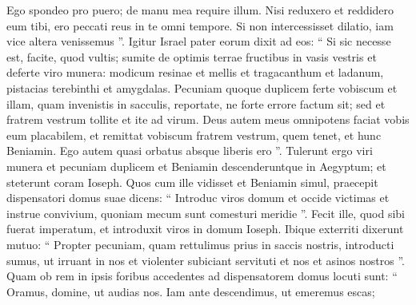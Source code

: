 \begin{biblechapter}
\begin{biblechapter}
\begin{biblechapter}
\begin{biblechapter}
\begin{biblechapter}
\begin{biblechapter}
\begin{biblechapter}
\begin{biblechapter}
\begin{biblechapter}
\begin{biblechapter}
\begin{biblechapter}
\begin{biblechapter}
\begin{biblechapter}
\begin{biblechapter}
\begin{biblechapter}
\begin{biblechapter}
\begin{biblechapter}
\begin{biblechapter}
\begin{biblechapter}
\begin{biblechapter}
\begin{biblechapter}
\begin{biblechapter}
\begin{biblechapter}
\begin{biblechapter}
\begin{biblechapter}
\begin{biblechapter}
\begin{biblechapter}
\begin{biblechapter}
\begin{biblechapter}
\begin{biblechapter}
\begin{biblechapter}
\begin{biblechapter}
\begin{biblechapter}
\begin{biblechapter}
\begin{biblechapter}
\begin{biblechapter}
\begin{biblechapter}
\begin{biblechapter}
\begin{biblechapter}
\begin{biblechapter}
\begin{biblechapter}
\begin{biblechapter}
\begin{biblechapter}
\verse Ego spondeo pro puero; de manu mea require illum. Nisi reduxero et reddidero eum tibi, ero peccati reus in te omni tempore. 
\verse Si non intercessisset dilatio, iam vice altera venissemus ”.
 \verse Igitur Israel pater eorum dixit ad eos: “ Si sic necesse est, facite, quod vultis; sumite de optimis terrae fructibus in vasis vestris et deferte viro munera: modicum resinae et mellis et tragacanthum et ladanum, pistacias terebinthi et amygdalas. 
\verse Pecuniam quoque duplicem ferte vobiscum et illam, quam invenistis in sacculis, reportate, ne forte errore factum sit; 
 \verse sed et fratrem vestrum tollite et ite ad virum. 
\verse Deus autem meus omnipotens faciat vobis eum placabilem, et remittat vobiscum fratrem vestrum, quem tenet, et hunc Beniamin. Ego autem quasi orbatus absque liberis ero ”.
 \verse Tulerunt ergo viri munera et pecuniam duplicem et Beniamin descenderuntque in Aegyptum; et steterunt coram Ioseph. 
\verse Quos cum ille vidisset et Beniamin simul, praecepit dispensatori domus suae dicens: “ Introduc viros domum et occide victimas et instrue convivium, quoniam mecum sunt comesturi meridie ”. 
\verse Fecit ille, quod sibi fuerat imperatum, et introduxit viros in domum Ioseph.
 \verse Ibique exterriti dixerunt mutuo: “ Propter pecuniam, quam rettulimus prius in saccis nostris, introducti sumus, ut irruant in nos et violenter subiciant servituti et nos et asinos nostros ”. 
\verse Quam ob rem in ipsis foribus accedentes ad dispensatorem domus 
\verse locuti sunt: “ Oramus, domine, ut audias nos. Iam ante descendimus, ut emeremus escas; 

\end{biblechapter}
\end{biblechapter}
\end{biblechapter}
\end{biblechapter}
\end{biblechapter}
\end{biblechapter}
\end{biblechapter}
\end{biblechapter}
\end{biblechapter}
\end{biblechapter}
\end{biblechapter}
\end{biblechapter}
\end{biblechapter}
\end{biblechapter}
\end{biblechapter}
\end{biblechapter}
\end{biblechapter}
\end{biblechapter}
\end{biblechapter}
\end{biblechapter}
\end{biblechapter}
\end{biblechapter}
\end{biblechapter}
\end{biblechapter}
\end{biblechapter}
\end{biblechapter}
\end{biblechapter}
\end{biblechapter}
\end{biblechapter}
\end{biblechapter}
\end{biblechapter}
\end{biblechapter}
\end{biblechapter}
\end{biblechapter}
\end{biblechapter}
\end{biblechapter}
\end{biblechapter}
\end{biblechapter}
\end{biblechapter}
\end{biblechapter}
\end{biblechapter}
\end{biblechapter}
\end{biblechapter}
